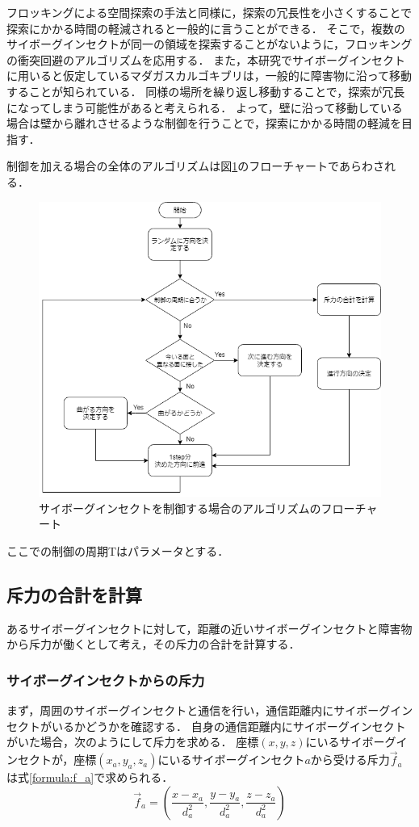 \documentclass[a4paper,11pt]{jarticle}
\begin{document}
	フロッキングによる空間探索の手法\cite{}と同様に，探索の冗長性を小さくすることで探索にかかる時間の軽減されると一般的に言うことができる．
	そこで，複数のサイボーグインセクトが同一の領域を探索することがないように，フロッキングの衝突回避のアルゴリズムを応用する．
	また，本研究でサイボーグインセクトに用いると仮定しているマダガスカルゴキブリは，一般的に障害物に沿って移動することが知られている．
	同様の場所を繰り返し移動することで，探索が冗長になってしまう可能性があると考えられる．
	よって，壁に沿って移動している場合は壁から離れさせるような制御を行うことで，探索にかかる時間の軽減を目指す．
	
	制御を加える場合の全体のアルゴリズムは図\ref{fig:control}のフローチャートであらわされる．
	
	\begin{figure}
		\centering
		\includegraphics[width=0.5\linewidth]{png/control.png}
		\caption[アルゴリズムのフローチャート]{サイボーグインセクトを制御する場合のアルゴリズムのフローチャート}
		\label{fig:control}
	\end{figure}
	ここでの制御の周期Tはパラメータとする．
	
	\subsection{斥力の合計を計算}
	\label{sec:repulsive}
	あるサイボーグインセクトに対して，距離の近いサイボーグインセクトと障害物から斥力が働くとして考え，その斥力の合計を計算する\cite{flocking-robot}．
	
	\subsubsection{サイボーグインセクトからの斥力}
	\label{sec:repulsive_insect}
	まず，周囲のサイボーグインセクトと通信を行い，通信距離内にサイボーグインセクトがいるかどうかを確認する．
	自身の通信距離内にサイボーグインセクトがいた場合，次のようにして斥力を求める．
	座標$(x,y,z)$にいるサイボーグインセクトが，座標$(x_a,y_a,z_a)$にいるサイボーグインセクト$a$から受ける斥力$\vec{f}_a$は式\ref{formula:f_a}で求められる．
	\begin{equation}
	\label{formula:f_a}
	\vec{f}_a = (\frac{x - x_a}{d_a^2},\frac{y- y_a}{d_a^2},\frac{z - z_a}{d_a^2})
	\end{equation}
	
\end{document}
